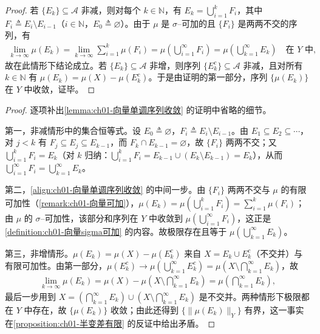 \documentclass[../../main.tex]{subfiles}%
\begin{document}
\begin{proof}
若 $\{E_k\}\subseteq\mathcal{A}$ 非减，则对每个 $k\in\mathbb{N}$，有 $E_k=\bigcup_{i=1}^k F_i$，其中 $F_i\triangleq E_i\setminus E_{i-1}$（$i\in\mathbb{N}$，$E_0\triangleq\varnothing$）。由于 $\mu$ 是 $\sigma$--可加的且 $\{F_i\}$ 是两两不交的序列，有
\begin{align}
\lim_{k\to\infty}\mu(E_k)=\lim_{k\to\infty}\sum_{i=1}^k\mu(F_i)
=\mu\left(\bigcup_{i=1}^\infty F_i\right)=\mu\left(\bigcup_{k=1}^\infty E_k\right)\quad\text{在 }Y\text{ 中}, \label{align:ch01-向量单调序列收敛}
\end{align}
故在此情形下结论成立。若 $\{E_k\}\subseteq\mathcal{A}$ 非增，则序列 $\{E_k^c\}\subseteq\mathcal{A}$ 非减，且对所有 $k\in\mathbb{N}$ 有 $\mu(E_k)=\mu(X)-\mu(E_k^c)$。于是由证明的第一部分，序列 $\{\mu(E_k)\}$ 在 $Y$ 中收敛，证毕。
\end{proof}

\begin{proof}
逐项补出\cref{lemma:ch01-向量单调序列收敛} 的证明中省略的细节。

第一，非减情形中的集合恒等式。设 $E_0\triangleq\varnothing$，$F_i\triangleq E_i\setminus E_{i-1}$。由 $E_1\subseteq E_2\subseteq\cdots$，对 $j<k$ 有 $F_j\subseteq E_j\subseteq E_{k-1}$，而 $F_k\cap E_{k-1}=\varnothing$，故 $\{F_i\}$ 两两不交；又 $\bigcup_{i=1}^k F_i=E_k$（对 $k$ 归纳：$\bigcup_{i=1}^kF_i=E_{k-1}\cup(E_k\setminus E_{k-1})=E_k$），从而 $\bigcup_{i=1}^\infty F_i=\bigcup_{k=1}^\infty E_k$。

第二，\eqref{align:ch01-向量单调序列收敛} 的中间一步。由 $\{F_i\}$ 两两不交与 $\mu$ 的有限可加性（\cref{remark:ch01-向量可加}），$\mu(E_k)=\mu\left(\bigcup_{i=1}^kF_i\right)=\sum_{i=1}^k\mu(F_i)$；由 $\mu$ 的 $\sigma$--可加性，该部分和序列在 $Y$ 中收敛到 $\mu\left(\bigcup_{i=1}^\infty F_i\right)$，这正是\cref{definition:ch01-向量sigma可加} 的内容。故极限存在且等于 $\mu\left(\bigcup_{k=1}^\infty E_k\right)$。

第三，非增情形。$\mu(E_k)=\mu(X)-\mu(E_k^c)$ 来自 $X=E_k\cup E_k^c$（不交并）与有限可加性。由第一部分，$\mu(E_k^c)\to\mu\left(\bigcup_{k=1}^\infty E_k^c\right)=\mu\left(X\setminus\bigcap_{k=1}^\infty E_k\right)$，故
\begin{align}
\lim_{k\to\infty}\mu(E_k)=\mu(X)-\mu\left(X\setminus\bigcap_{k=1}^\infty E_k\right)=\mu\left(\bigcap_{k=1}^\infty E_k\right), \label{align:ch01-向量单调序列收敛非增}
\end{align}
最后一步用到 $X=\left(\bigcap_{k=1}^\infty E_k\right)\cup\left(X\setminus\bigcap_{k=1}^\infty E_k\right)$ 是不交并。两种情形下极限都在 $Y$ 中存在，故 $\{\mu(E_k)\}$ 收敛；由此还得到 $\{\|\mu(E_k)\|_Y\}$ 有界，这一事实在\cref{proposition:ch01-半变差有限} 的反证中给出矛盾。
\end{proof}
\end{document}
